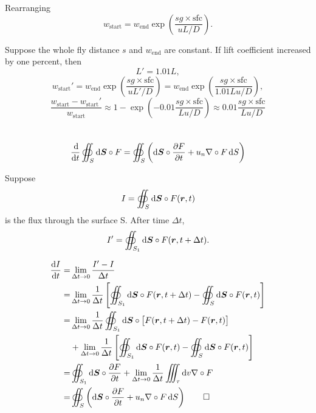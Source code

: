 \documentclass[12pt]{article}
\begin{document}
Rearranging
\begin{equation}
	w_\mathrm{start} = w_\mathrm{end} \exp\left( {\frac{sg \times \mathrm{sfc}}{uL/D}}\right).
\end{equation}

Suppose the whole fly distance $s$ and $w_\mathrm{end}$ are constant. If lift coefficient increased by one percent, then
\begin{equation}
	L' = 1.01L,
\end{equation}
\begin{equation}
	w_\mathrm{start}' = w_\mathrm{end} \exp\left( {\frac{sg \times \mathrm{sfc}}{uL'/D}}\right)= w_\mathrm{end} \exp\left( {\frac{sg \times \mathrm{sfc}}{1.01Lu/D}}\right),
\end{equation}
\begin{equation}
	\frac{w_\mathrm{start}-w_\mathrm{start}'}{w_\mathrm{start}} \approx 1 - \exp\left(- 0.01 {\frac{sg \times \mathrm{sfc}}{Lu/D}}\right)  \approx 0.01 {\frac{sg \times \mathrm{sfc}}{Lu/D}}
\end{equation}

\section{}

\begin{equation}
	\frac{\dif}{\dif t} \oiint_{S} \dif \boldsymbol{S} \circ F = \oiint_{S}\left(\dif \boldsymbol{S} \circ \frac{\partial F}{\partial t}+u_{n} \nabla \circ F \dif S\right)
\end{equation}

Suppose
\begin{equation}
	I = \oiint_{S} \dif \boldsymbol{S} \circ F(\bm{r},t)
\end{equation}
is the flux through the surface S. After time $\Delta t$,
\begin{equation}
	I' = \oiint_{S_1} \dif \boldsymbol{S} \circ F(\bm{r},t+\Delta t).
\end{equation}

\begin{equation}
	\begin{split}
		\frac{\dif I}{\dif t} = & \lim_{\Delta t \to 0} \frac{I'-I}{\Delta t}\\
		= & \lim_{\Delta t \to 0} \frac{1}{\Delta t} \left[ \oiint_{S_1} \dif \boldsymbol{S} \circ F(\bm{r},t+\Delta t) - \oiint_{S} \dif \boldsymbol{S} \circ F(\bm{r},t) \right]\\
		= & \lim_{\Delta t \to 0} \frac{1}{\Delta t} \oiint_{S_1} \dif \boldsymbol{S} \circ \left[ F(\bm{r},t+\Delta t) -  F(\bm{r},t) \right]\\
		& + \lim_{\Delta t \to 0} \frac{1}{\Delta t} \left[ \oiint_{S_1} \dif \boldsymbol{S} \circ F(\bm{r},t) - \oiint_{S} \dif \boldsymbol{S} \circ F(\bm{r},t) \right]\\
		= & \oiint_{S_1} \dif \boldsymbol{S} \circ \frac{\partial F}{\partial t} + \lim_{\Delta t \to 0} \frac{1}{\Delta t} \iiint_ {\tau} \dif v \nabla \circ F\\
		= & \oiint_{S}\left(\dif \boldsymbol{S} \circ \frac{\partial F}{\partial t}+u_{n} \nabla \circ F \dif S\right)\qed
	\end{split}
\end{equation}
\end{document}
